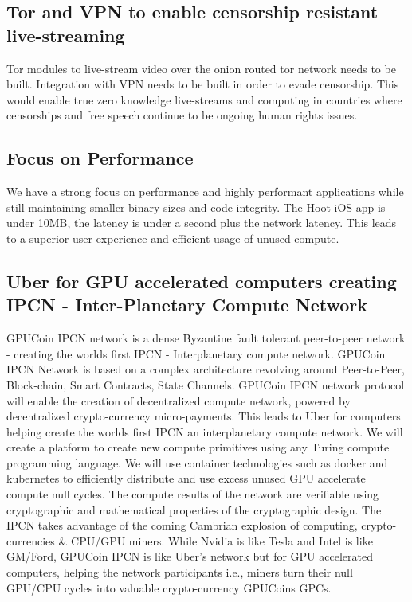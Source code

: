 \documentclass{article}
\begin{document}
\subsection{Tor and VPN to enable censorship resistant live-streaming }
Tor modules to live-stream video over the onion routed tor network needs to be built. Integration with VPN needs to be built in order to evade censorship. This would enable true zero knowledge live-streams and computing in countries where censorships and free speech continue to be ongoing human rights issues.

\subsection{Focus on Performance}
We have a strong focus on performance and highly performant applications while still maintaining smaller binary sizes and code integrity. The Hoot iOS app is under 10MB, the latency is under a second plus the network latency. This leads to a superior user experience and efficient usage of unused compute.

\subsection{Uber for GPU accelerated computers creating IPCN - Inter-Planetary Compute Network}
GPUCoin IPCN network is a dense Byzantine fault tolerant peer-to-peer network - creating the worlds first IPCN - Interplanetary compute network. GPUCoin IPCN Network is based on a complex architecture revolving around Peer-to-Peer, Block-chain, Smart Contracts, State Channels. GPUCoin IPCN network protocol will enable the creation of decentralized compute network, powered by decentralized crypto-currency micro-payments. This leads to Uber for computers helping create the worlds first IPCN an interplanetary compute network. We will create a platform to create new compute primitives using any Turing compute programming language. We will use container technologies such as docker and kubernetes to efficiently distribute and use excess unused GPU accelerate compute null cycles. The compute results of the network are verifiable using cryptographic and mathematical properties of the cryptographic design. The IPCN takes advantage of the coming Cambrian explosion of computing, crypto-currencies \& CPU/GPU miners. While Nvidia is like Tesla and Intel is like GM/Ford, GPUCoin IPCN is like Uber's network but for GPU accelerated computers, helping the network participants i.e., miners turn their null GPU/CPU cycles into valuable crypto-currency GPUCoins GPCs.
\end{document}
